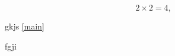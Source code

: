 \documentclass[12pt,a4paper]{report}
\begin{document}



\begin{equation}
2\times 2=4,\label{main}
\end{equation}

gkjs \ref{main}

fgji \citep{ER89}


\end{document}
